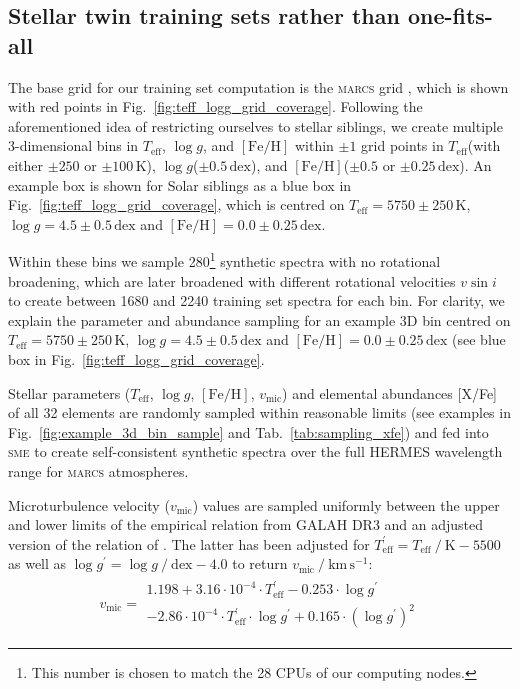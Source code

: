 \documentclass[
  journal=pasa,
  manuscript=research-paper, %
  year=2024,
  volume=37
]{cup-journal}
\newcommand{\Teff}{$T_\mathrm{eff}$\xspace}
\newcommand{\logg}{$\log g$\xspace}
\newcommand{\feh}{$\mathrm{[Fe/H]}$\xspace}
\newcommand{\vmic}{$v_\mathrm{mic}$\xspace}
\newcommand{\vsini}{$v \sin i$\xspace}
\newcommand{\sme}{\textsc{sme}\xspace}
\newcommand{\marcs}{\textsc{marcs}\xspace}
\newcommand{\dex}{\,\mathrm{dex}}	%
\newcommand{\K}{\,\mathrm{K}}	%
\begin{document}
\subsection{Stellar twin training sets rather than one-fits-all}
\label{sec:spectrum_grid}

The base grid for our training set computation is the \marcs grid \citep{Gustafsson2008}, which is shown with red points in Fig.~\ref{fig:teff_logg_grid_coverage}. Following the aforementioned idea of restricting ourselves to stellar siblings, we create multiple 3-dimensional bins in \Teff, \logg, and \feh within $\pm 1$ grid points in \Teff (with either $\pm 250$ or $\pm 100\K$), \logg ($\pm 0.5\dex$), and \feh ($\pm 0.5$ or $\pm 0.25\dex $). An example box is shown for Solar siblings as a blue box in Fig.~\ref{fig:teff_logg_grid_coverage}, which is centred on $T_\text{eff} = 5750\pm250\K$, $\log g = 4.5\pm0.5\dex$ and $\mathrm{[Fe/H]} = 0.0\pm0.25\dex$.

Within these bins we sample 280\footnote{This number is chosen to match the 28 CPUs of our computing nodes.} synthetic spectra with no rotational broadening, which are later broadened with different rotational velocities \vsini to create between 1680 and 2240 training set spectra for each bin. For clarity, we explain the parameter and abundance sampling for an example 3D bin centred on $T_\text{eff} = 5750\pm250\K$, $\log g = 4.5\pm0.5\dex$ and $\mathrm{[Fe/H]} = 0.0\pm0.25\dex$ (see blue box in Fig.~\ref{fig:teff_logg_grid_coverage}.

Stellar parameters (\Teff, \logg, \feh, \vmic) and elemental abundances [X/Fe] of all 32 elements are randomly sampled within reasonable limits (see examples in Fig.~\ref{fig:example_3d_bin_sample} and Tab.~\ref{tab:sampling_xfe}) and fed into \sme to create self-consistent synthetic spectra over the full HERMES wavelength range for \marcs atmospheres. 

Microturbulence velocity (\vmic) values are sampled uniformly between the upper and lower limits of the empirical relation from GALAH DR3 \citep[Eqs.~4 and 5 from][]{Buder2021} and an adjusted version of the relation of \citet{DutraFerreira2016}. The latter has been adjusted for $T_\text{eff}^\prime = T_\text{eff}~/~\mathrm{K} - 5500$ as well as $\log g^\prime = \log g~/~\mathrm{dex} - 4.0$ to return $v_\text{mic}~/~\mathrm{km\,s^{-1}}$:
\begin{align} 
v_\text{mic} = \begin{array}{l}
1.198 + 3.16 \cdot 10^{-4} \cdot T_\text{eff}^\prime - 0.253 \cdot \log g^\prime \\ - 2.86\cdot 10^{-4} \cdot T_\text{eff}^\prime \cdot \log g^\prime + 0.165 \cdot (\log g^\prime)^2
\end{array} \label{eq:vmic_initial}
\end{align}
\end{document}
